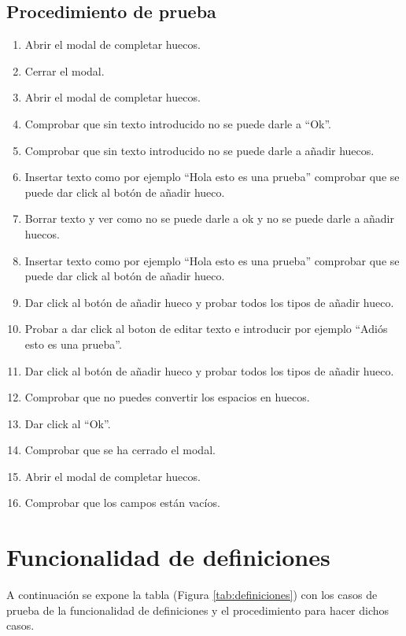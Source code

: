 \subsection{Procedimiento de prueba}
\label{procedimientoPruebas:huecos}
\begin{enumerate}
    \item Abrir el modal de completar huecos.
    \item Cerrar el modal.
    \item Abrir el modal de completar huecos.
    \item Comprobar que sin texto introducido no se puede darle a ``Ok''.
    \item Comprobar que sin texto introducido no se puede darle a añadir huecos.
    \item Insertar texto como por ejemplo ``Hola esto es una prueba'' comprobar que se puede dar click al botón de añadir hueco.
    \item Borrar texto y ver como no se puede darle a ok y no se puede darle a añadir huecos.
    \item Insertar texto como por ejemplo ``Hola esto es una prueba'' comprobar que se puede dar click al botón de añadir hueco.
    \item Dar click al botón de añadir hueco y probar todos los tipos de añadir hueco.
    \item Probar a dar click al boton de editar texto e introducir por ejemplo ``Adiós esto es una prueba''.
    \item Dar click al botón de añadir hueco y probar todos los tipos de añadir hueco.
    \item Comprobar que no puedes convertir los espacios en huecos.
    \item Dar click al ``Ok''.
    \item Comprobar que se ha cerrado el modal.
    \item Abrir el modal de completar huecos.
    \item Comprobar que los campos están vacíos.
\end{enumerate}

\section{Funcionalidad de definiciones}
\label{planPruebas:definiciones}
A continuación se expone la tabla (Figura \ref{tab:definiciones}) con los casos de prueba de la funcionalidad de definiciones y el procedimiento para hacer dichos casos.

